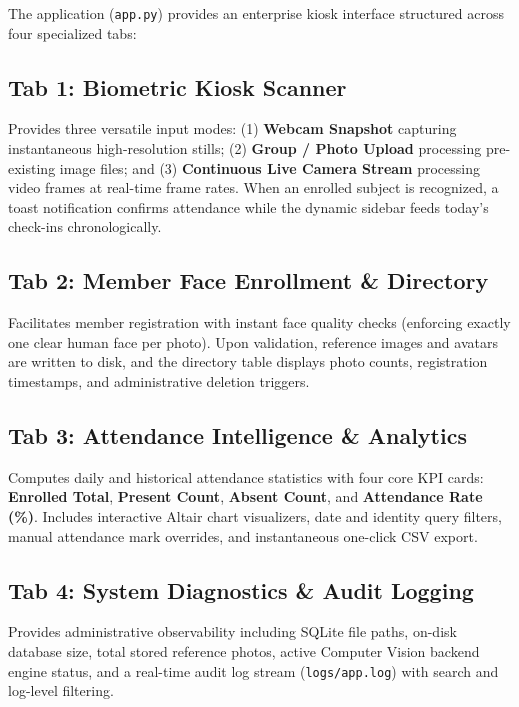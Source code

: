 \documentclass[12pt,a4paper]{article}
\begin{document}
The application (\texttt{app.py}) provides an enterprise kiosk interface structured across four specialized tabs:

\subsection{Tab 1: Biometric Kiosk Scanner}
Provides three versatile input modes: (1) \textbf{Webcam Snapshot} capturing instantaneous high-resolution stills; (2) \textbf{Group / Photo Upload} processing pre-existing image files; and (3) \textbf{Continuous Live Camera Stream} processing video frames at real-time frame rates. When an enrolled subject is recognized, a toast notification confirms attendance while the dynamic sidebar feeds today's check-ins chronologically.

\subsection{Tab 2: Member Face Enrollment \& Directory}
Facilitates member registration with instant face quality checks (enforcing exactly one clear human face per photo). Upon validation, reference images and avatars are written to disk, and the directory table displays photo counts, registration timestamps, and administrative deletion triggers.

\subsection{Tab 3: Attendance Intelligence \& Analytics}
Computes daily and historical attendance statistics with four core KPI cards: \textbf{Enrolled Total}, \textbf{Present Count}, \textbf{Absent Count}, and \textbf{Attendance Rate (\%)}. Includes interactive Altair chart visualizers, date and identity query filters, manual attendance mark overrides, and instantaneous one-click CSV export.

\subsection{Tab 4: System Diagnostics \& Audit Logging}
Provides administrative observability including SQLite file paths, on-disk database size, total stored reference photos, active Computer Vision backend engine status, and a real-time audit log stream (\texttt{logs/app.log}) with search and log-level filtering.

\newpage

\end{document}
